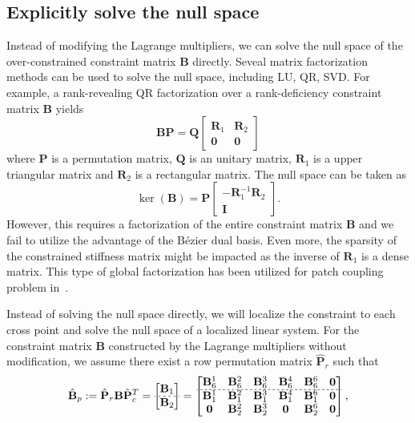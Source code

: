 \documentclass[preprint,12pt]{elsarticle}
\newcommand{\Bezier}{{B\'{e}zier} }
\theoremstyle{remark}
\begin{document}
\subsection{Explicitly solve the null space}
Instead of modifying the Lagrange multipliers, we can solve the null space of the over-constrained constraint matrix $\mathbf{B}$ directly. Seveal matrix factorization methods can be used to solve the null space, including LU, QR, SVD. For example, a rank-revealing QR factorization over a rank-deficiency constraint matrix $\mathbf{B}$ yields
\begin{equation}
    \mathbf{B}\mathbf{P}=
    \mathbf{Q}
    \begin{bmatrix}
        \mathbf{R}_1 & \mathbf{R}_2 \\
        \mathbf{0} & \mathbf{0}
    \end{bmatrix}
\end{equation}
where $\mathbf{P}$ is a permutation matrix, $\mathbf{Q}$ is an unitary matrix, $\mathbf{R}_1$ is a upper triangular matrix and $\mathbf{R}_2$ is a rectangular matrix. The null space can be taken as 
\begin{equation}
    \ker(\mathbf{B})=
    \mathbf{P}
    \begin{bmatrix}
        -\mathbf{R}_1^{-1}\mathbf{R}_2\\
        \mathbf{I}
    \end{bmatrix}.\label{eq:direct_kernel}
\end{equation}
However, this requires a factorization of the entire constraint matrix $\mathbf{B}$ and we fail to utilize the advantage of the \Bezier dual basis. Even more, the sparsity of the constrained stiffness matrix might be impacted as the inverse of $\mathbf{R}_1$ is a dense matrix. This type of global factorization has been utilized for patch coupling problem in~\cite{coox_robust_2017, coox2017flexible, dornisch2017dual}.\par
Instead of solving the null space directly, we will localize the constraint to each cross point and solve the null space of a localized linear system. For the constraint matrix $\mathbf{B}$ constructed by the Lagrange multipliers without modification, we assume there exist a row permutation matrix $\hat{\mathbf{P}}_r$ such that
\begin{equation}
    \hat{\mathbf{B}}_p:=\hat{\mathbf{P}}_r\mathbf{B}\tilde{\mathbf{P}}_c^T=
    \begin{bmatrix}
        {\mathbf{B}}_1\\  \hdashline[2pt/2pt]
        {\mathbf{B}}_2
    \end{bmatrix}
    =
    \begin{bmatrix}
        \mathbf{B}_6^1 & \mathbf{B}_6^2 & \mathbf{B}_6^3 & \mathbf{B}_6^4 & \mathbf{B}_6^6 & \mathbf{0} \\ \hdashline[2pt/2pt]
        \mathbf{B}_1^1 & \mathbf{B}_1^2 & \mathbf{B}_1^3 & \mathbf{B}_1^4 & \mathbf{B}_1^6 & \mathbf{0} \\
        \mathbf{0} & \mathbf{B}_2^2 & \mathbf{B}_2^3 & \mathbf{0} & \mathbf{B}_2^6 & \mathbf{0}
    \end{bmatrix},
\end{equation}
\end{document}

